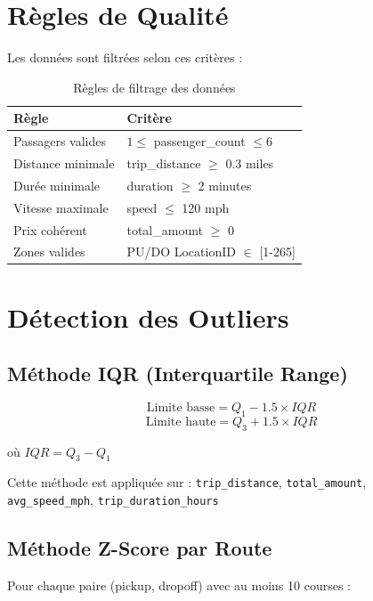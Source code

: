 \documentclass[12pt,a4paper]{report}
\begin{document}
\section{Règles de Qualité}

Les données sont filtrées selon ces critères :

\begin{table}[H]
\centering
\caption{Règles de filtrage des données}
\begin{tabular}{@{}ll@{}}
\toprule
\textbf{Règle} & \textbf{Critère} \\
\midrule
Passagers valides & $1 \leq$ passenger\_count $\leq 6$ \\
Distance minimale & trip\_distance $\geq$ 0.3 miles \\
Durée minimale & duration $\geq$ 2 minutes \\
Vitesse maximale & speed $\leq$ 120 mph \\
Prix cohérent & total\_amount $\geq$ 0 \\
Zones valides & PU/DO LocationID $\in$ [1-265] \\
\bottomrule
\end{tabular}
\end{table}

\section{Détection des Outliers}

\subsection{Méthode IQR (Interquartile Range)}

\begin{equation}
\text{Limite basse} = Q_1 - 1.5 \times IQR
\end{equation}
\begin{equation}
\text{Limite haute} = Q_3 + 1.5 \times IQR
\end{equation}

où $IQR = Q_3 - Q_1$

Cette méthode est appliquée sur : \texttt{trip\_distance}, \texttt{total\_amount}, \texttt{avg\_speed\_mph}, \texttt{trip\_duration\_hours}

\subsection{Méthode Z-Score par Route}

Pour chaque paire (pickup, dropoff) avec au moins 10 courses :
\end{document}
